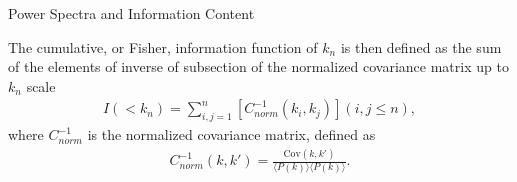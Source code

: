 \begin{section}{Power Spectra and Information Content}
\begin{figure}
    \label{fig:corrall}

\end{figure}
    The cumulative, or Fisher, information function of $k_n$ is then defined as the sum of the elements of inverse of subsection of the normalized covariance matrix up to $k_n$ scale
\begin{align}
    I \left( < k_n\right) = \sum_{i,j=1}^n \left[ C^{-1}_{norm} \left( k_i,k_j \right)\right] \left( i,j \leq n \right),
\end{align}
where $C^{-1}_{norm}$ is the normalized covariance matrix, defined as
\begin{align}
    C^{-1}_{norm} \left( k,k' \right)=\frac{\mathrm{Cov}(k,k')}{\langle P(k)\rangle\langle P(k)\rangle}.
\end{align}
  

\end{section}
